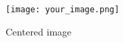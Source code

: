 \begin{figure}[ht]
    \centering
    \texttt{[image: your\_image.png]}
    \caption{Centered image}
\end{figure}
